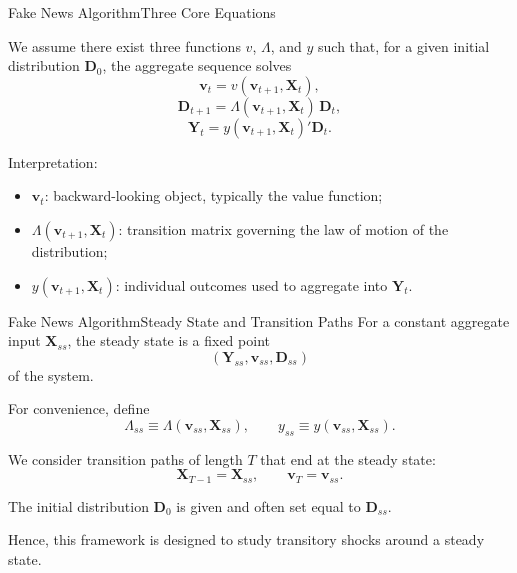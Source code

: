 \documentclass[aspectratio=169]{beamer}
\begin{document}
\begin{frame}{Fake News Algorithm}{Three Core Equations}

    We assume there exist three functions $v$, $\Lambda$, and $y$ such that,
    for a given initial distribution $\bm{D}_0$, the aggregate sequence solves
    \[
        \bm{v}_t = v(\bm{v}_{t+1}, \bm{X}_t),
    \]
    \[
        \bm{D}_{t+1} = \Lambda(\bm{v}_{t+1}, \bm{X}_t)\,\bm{D}_t,
    \]
    \[
        \bm{Y}_t = y(\bm{v}_{t+1}, \bm{X}_t)' \bm{D}_t.
    \]

    \vspace{0.7em}

    Interpretation:
    \begin{itemize}
        \item $\bm{v}_t$: backward-looking object, typically the value function;
        \item $\Lambda(\bm{v}_{t+1}, \bm{X}_t)$: transition matrix governing the law of motion of the distribution;
        \item $y(\bm{v}_{t+1}, \bm{X}_t)$: individual outcomes used to aggregate into $\bm{Y}_t$.
    \end{itemize}
\end{frame}



\begin{frame}{Fake News Algorithm}{Steady State and Transition Paths}
    \small
    For a constant aggregate input $\bm{X}_{ss}$, the steady state is a fixed point
    \[
        (\bm{Y}_{ss}, \bm{v}_{ss}, \bm{D}_{ss})
    \]
    of the system.

    \vspace{0.5em}

    For convenience, define
    \[
        \Lambda_{ss} \equiv \Lambda(\bm{v}_{ss}, \bm{X}_{ss}),
        \qquad
        y_{ss} \equiv y(\bm{v}_{ss}, \bm{X}_{ss}).
    \]

    \vspace{0.5em}

    We consider transition paths of length $T$ that end at the steady state:
    \[
        \bm{X}_{T-1} = \bm{X}_{ss},
        \qquad
        \bm{v}_T = \bm{v}_{ss}.
    \]

    The initial distribution $\bm{D}_0$ is given and often set equal to $\bm{D}_{ss}$.
    \vspace{0.5em}

    Hence, this framework is designed to study \alert{transitory shocks around a steady state}.
\end{frame}
\end{document}
